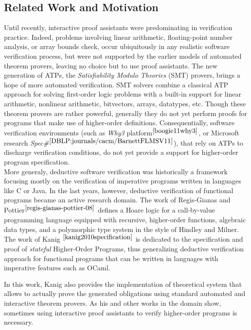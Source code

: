 \documentclass[a4paper,11pt,oneside]{article}
\theoremstyle{plain}
\begin{document}
\subsection{Related Work and Motivation}

	Until recently, interactive proof assistants were predominating
in verification practice.
	Indeed, problems involving linear arithmetic, floating-point number analysis,
or array bounds check, occur ubiquitously in any realistic software
 verification process, but were not supported by the earlier models of automated theorem provers, leaving no choice but to use proof assistants.
	The new generation of ATPs, the \textit{Satisfiability Modulo Theories} (SMT) provers, brings a hope of more automated verification.
	SMT solvers combine a classical ATP approach for solving first-order logic problems with a built-in support for linear arithmetic, nonlinear arithmetic, bitvectors, arrays, datatypes, etc.
	Though these theorem provers are rather powerful, generally they do not yet perform proofs for programs that make use of higher-order definitions. 
	Consequentially, software verification environments (such as \textit{Why3} platform$^{\cite{boogie11why3}}$, or Microsoft research \textit{Spec\#}$^{\cite{DBLP:journals/cacm/BarnettFLMSV11}}$), that rely on ATPs to discharge verification conditions, do not yet provide a support for higher-order program specification. \\
	
	More generaly, deductive software verification was historically a framework focusing mostly on the verification of imperative programs written in languages like C or Java. 
	In the last years, however, deductive verification of functional programs became an
active research domain.  The work of Regis-Gianas and
Pottier$^{\cite{regis-gianas-pottier-08}}$ defines a Hoare logic for a
call-by-value programming language equipped with recursive,
higher-order functions, algebraic data types, and a polymorphic type
system in the style of Hindley and Milner.  The work of
Kanig$^{~\cite{kanig2010specification}}$ is dedicated to the
specification and proof of \textit{stateful} Higher-Order Programs,
thus generalizing deductive verification approach for functional
programs that can be written in languages with imperative features
such as OCaml.

 In this work, Kanig also provides the implementation of theoretical system that allows to actually prove the generated obligations using standard automated and interactive theorem provers. 
 As his and other works in the domain show, sometimes using interactive proof assistants to verify higher-order programs is necessary. 
  
\end{document}
